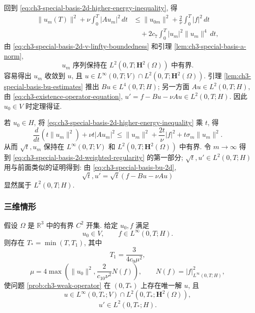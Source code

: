 \begin{Proof}
\hypertarget{chapter-03-page-229}{}
回到 \eqref{eq:ch3-special-basis-2d-higher-energy-inequality}, 得
\[
\begin{aligned}
\lVert u_m(T)\rVert^2+\nu\int_0^T|Au_m|^2\,dt
&\leq\lVert u_{0m}\rVert^2+\frac2\nu\int_0^T|f|^2\,dt\\
&\quad+2c_7\int_0^T|u_m|^2\lVert u_m\rVert^4\,dt,
\end{aligned}
\]
由 \eqref{eq:ch3-special-basis-2d-v-linfty-boundedness} 和引理 \ref{lem:ch3-special-basis-a-norm},
\begin{equation}
u_m\text{ 序列保持在 }L^2(0,T;\mathbf H^2(\Omega))\text{ 中有界}.
\label{eq:ch3-special-basis-2d-h2-boundedness}
\end{equation}
容易得出 $u_m$ 收敛到 $u$, 且 $u\in L^\infty(0,T;V)\cap L^2(0,T;\mathbf H^2(\Omega))$. 引理 \ref{lem:ch3-special-basis-bu-estimates} 推出 $Bu\in L^4(0,T;H)$; 另一方面 $Au\in L^2(0,T;H)$, 由 \eqref{eq:ch3-existence-operator-equation}, $u'=f-Bu-\nu Au\in L^2(0,T;H)$. 因此 $u_0\in V$ 时定理得证.

若 $u_0\in H$, 将 \eqref{eq:ch3-special-basis-2d-higher-energy-inequality} 乘 $t$, 得
\[
\frac d{dt}(t\lVert u_m\rVert^2)+\nu t|Au_m|^2
\leq\lVert u_m\rVert^2+\frac{2t}\nu|f|^2+t\sigma_m\lVert u_m\rVert^2.
\]
从而 $\sqrt t,u_m$ 保持在 $L^\infty(0,T;V)$ 和 $L^2(0,T;\mathbf H^2(\Omega))$ 中有界. 令 $m\to\infty$ 得到 \eqref{eq:ch3-special-basis-2d-weighted-regularity} 的第一部分; $\sqrt t,u'\in L^2(0,T;H)$ 用与前面类似的证明得到: 由 \eqref{eq:ch3-special-basis-bu-2d},
\[
\sqrt t,u'=\sqrt t(f-Bu-\nu Au)
\]
显然属于 $L^2(0,T;H)$.
\end{Proof}

\subsubsection{三维情形}
\label{subsubsec:ch3-special-basis-3d}

\begin{Theorem}
\label{thm:ch3-special-basis-3d}
假设 $\Omega$ 是 $\mathbb R^3$ 中的有界 $C^2$ 开集. 给定 $u_0,f$ 满足
\begin{equation}
u_0\in V,
\qquad f\in L^\infty(0,T;H).
\label{eq:ch3-special-basis-3d-data}
\end{equation}
则存在 $T_*=\min(T,T_1)$, 其中
\begin{equation}
T_1=\frac3{4c_9\mu^2},
\label{eq:ch3-special-basis-3d-t1}
\end{equation}
\begin{equation}
\mu=4\max\left(\lVert u_0\rVert^2,
\frac2{c_{10}\nu^2}N(f)\right),
\qquad N(f)=|f|_{L^\infty(0,T;H)}^2,
\label{eq:ch3-special-basis-3d-mu}
\end{equation}
使问题 \ref{prob:ch3-weak-operator} 在 $(0,T_*)$ 上存在唯一解 $u$, 且
\begin{equation}
u\in L^\infty(0,T_*;V)\cap L^2(0,T_*;\mathbf H^2(\Omega)),
\label{eq:ch3-special-basis-3d-solution-space}
\end{equation}
\begin{equation}
u'\in L^2(0,T_*;H).
\label{eq:ch3-special-basis-3d-time-regularity}
\end{equation}
\end{Theorem}

